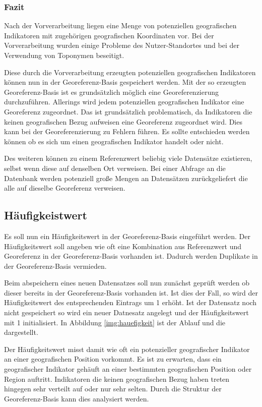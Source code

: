 			\subsubsection{Fazit} 

				Nach der Vorverarbeitung liegen eine Menge von potenziellen geografischen Indikatoren mit zugehörigen geografischen Koordinaten vor.
				Bei der Vorverarbeitung wurden einige Probleme des Nutzer-Standortes und bei der Verwendung von Toponymen beseitigt.

				Diese durch die Vorverarbeitung erzeugten potenziellen geografischen Indikatoren können nun in der Georeferenz-Basis gespeichert werden.
				Mit der so erzeugten Georeferenz-Basis ist es grundsätzlich möglich eine Georeferenzierung durchzuführen. 
				Allerings wird jedem potenziellen geografischen Indikator eine Georeferenz zugeordnet.
				Das ist grundsätzlich problematisch, da Indikatoren die keinen geografischen Bezug aufweisen eine Georeferenz zugeordnet wird. 
				Dies kann bei der Georeferenzierung zu Fehlern führen.
				Es sollte entschieden werden können ob es sich um einen geografischen Indikator handelt oder nicht. 

				Des weiteren können zu einem Referenzwert beliebig viele Datensätze existieren, selbst wenn diese auf denselben Ort verweisen. 
				Bei einer Abfrage an die Datenbank werden potenziell große Mengen an Datensätzen zurückgeliefert die alle auf dieselbe Georeferenz verweisen.

		\subsection{Häufigkeistwert}

			Es soll nun ein Häufigkeitswert in der Georeferenz-Basis eingeführt werden.
			Der Häufigkeitswert soll angeben wie oft eine Kombination aus Referenzwert und Georeferenz in der Georeferenz-Basis vorhanden ist.
			Dadurch werden Duplikate in der Georeferenz-Basis vermieden.

			Beim abspeichern eines neuen Datensatzes soll nun zunächst geprüft werden ob dieser bereits in der Georeferenz-Basis vorhanden ist. 
			Ist dies der Fall, so wird der Häufigkeitswert des entsprechenden Eintrags um 1 erhöht.
			Ist der Datensatz noch nicht gespeichert so wird ein neuer Datnesatz angelegt und der Häufigkeitswert mit 1 initialisiert.
			In Abbildung \ref{img:hauefigkeit} ist der Ablauf und die  dargestellt. 

			Der Häufigkeitswert misst damit wie oft ein potenzieller geografischer Indikator an einer geografischen Position vorkommt.
			Es ist zu erwarten, dass ein geografischer Indikator gehäuft an einer bestimmten geografischen Position oder Region auftritt.
			Indikatoren die keinen geografischen Bezug haben treten hingegen sehr verteilt auf oder nur sehr selten. 
			Durch die Struktur der Georeferenz-Basis kann dies analysiert werden.


